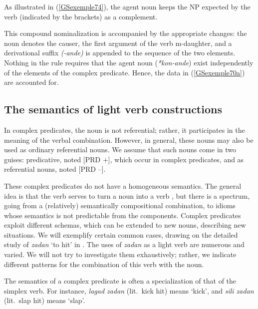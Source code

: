 {As illustrated in (\ref{GSexemple74}), the agent noun keeps the NP expected by the verb (indicated by the brackets) as a complement.   

\begin{exe}
	\label{GSexemple74}

\end{exe}

This compound nominalization is accompanied by the appropriate changes: the noun denotes the causer, the first argument of the verb m-daughter, and a derivational suffix \emph{(-ande)} is appended to the sequence of the two elements. Nothing in the rule requires that the agent noun (\emph{*kon-ande}) exist independently of the elements of the complex predicate. Hence, the data in (\ref{GSexemple70a}) are accounted for.

\subsection{The semantics of light verb constructions}\label{GSsection5.3}

In complex predicates, the noun is not referential; rather, it participates in the meaning of the verbal combination. However, in general, these nouns may also be used as ordinary referential nouns. We assume that such nouns come in two guises: predicative, noted [PRD $+$], which occur in complex predicates, and as referential nouns, noted [PRD $–$].

These complex predicates do not have a homogeneous semantics. The general idea is that the verb serves to turn a noun into a verb \citep{bonami2010persian}, but there is a spectrum, going from a (relatively) semantically compositional combination, to idioms whose semantics is not predictable from the components. Complex predicates exploit different schemas, which can be extended to new nouns, describing new situations. We will exemplify certain common cases, drawing on the detailed study of \emph{zadan} `to hit' in \cite{pollet2012grammaire}. The uses of \emph{zadan} as a light verb are numerous and varied. We will not try to investigate them exhaustively; rather, we indicate different patterns for the combination of this verb with the noun. 

The semantics of a complex predicate is often a specialization of that of the simplex verb. For instance, \emph{lagad zadan} (lit.\ kick hit) means `kick', and \emph{sili zadan} (lit.\ slap hit) means `slap'. 

}
